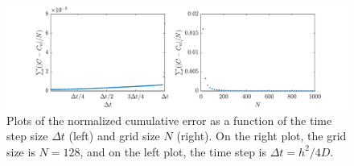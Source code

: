 \documentclass[a4paper,10pt]{article} 	%
\numberwithin{equation}{section}
\begin{document}
	\begin{figure}[H]
		\centering
		\includegraphics[width = \linewidth]{diffErr.pdf}
		\caption{Plots of the normalized cumulative error as a function of the time step size $ \Delta t $ (left) and grid size $ N $ (right). On the right plot, the grid size is $ N = 128 $, and on the left plot, the time step is $ \Delta t = h^2/4D $.}
		\label{fig:diffErr}
	\end{figure}
	
	
\end{document}
